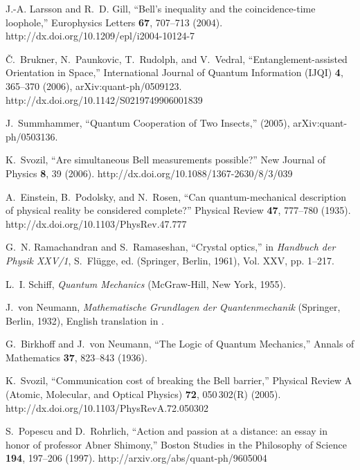\documentclass[fleqn,twoside]{article}      %
\begin{document}
\begin{thebibliography}{10}
J.-A. Larsson and R.~D. Gill, \enquote{Bell's inequality and the
  coincidence-time loophole,} Europhysics Letters {\bf 67}, 707--713 (2004).
\newline http://dx.doi.org/10.1209/epl/i2004-10124-7

{\v{C}}.~Brukner, N.~Paunkovic, T.~Rudolph, and V.~Vedral,
  \enquote{Entanglement-assisted Orientation in Space,} International Journal
  of Quantum Information (IJQI) {\bf 4}, 365--370 (2006),
  arXiv:quant-ph/0509123.
\newline http://dx.doi.org/10.1142/S0219749906001839

J.~Summhammer, \enquote{Quantum Cooperation of Two Insects,}  (2005),
  arXiv:quant-ph/0503136.

K.~Svozil, \enquote{Are simultaneous Bell measurements possible?} New Journal
  of Physics {\bf 8}, 39 (2006).
\newline http://dx.doi.org/10.1088/1367-2630/8/3/039

A.~Einstein, B.~Podolsky, and N.~Rosen, \enquote{Can quantum-mechanical
  description of physical reality be considered complete?} Physical Review {\bf
  47}, 777--780 (1935).
\newline http://dx.doi.org/10.1103/PhysRev.47.777

G.~N. Ramachandran and S.~Ramaseshan, \enquote{Crystal optics,} in {\em
  Handbuch der Physik XXV/1\/}, S.~Fl{\"{u}}gge, ed.  (Springer, Berlin, 1961),
  Vol. XXV, pp. 1--217.

L.~I. Schiff, {\em Quantum Mechanics\/} (McGraw-Hill, New York, 1955).

J.~von Neumann, {\em Mathematische Grundlagen der Quantenmechanik\/} (Springer,
  Berlin, 1932), {E}nglish translation in \cite{v-neumann-55}.

G.~Birkhoff and J.~von Neumann, \enquote{The Logic of Quantum Mechanics,}
  Annals of Mathematics {\bf 37}, 823--843 (1936).

K.~Svozil, \enquote{Communication cost of breaking the {B}ell barrier,}
  Physical Review A (Atomic, Molecular, and Optical Physics) {\bf 72},
  050\,302(R) (2005).
\newline http://dx.doi.org/10.1103/PhysRevA.72.050302

S.~Popescu and D.~Rohrlich, \enquote{Action and passion at a distance: an essay
  in honor of professor {A}bner {S}himony,} Boston Studies in the Philosophy of
  Science {\bf 194}, 197--206 (1997).
\newline http://arxiv.org/abs/quant-ph/9605004


\end{thebibliography}
\end{document}
